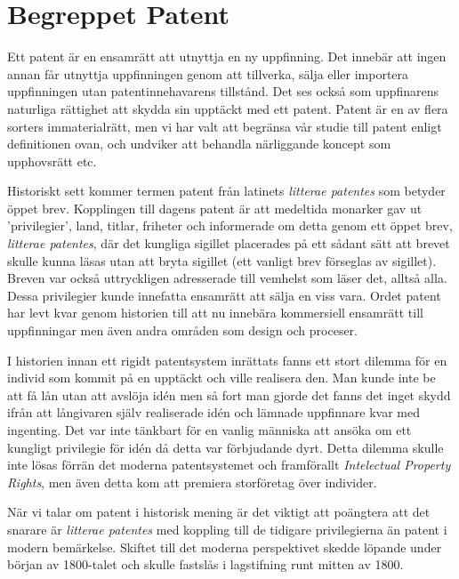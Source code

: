 





\section{Begreppet Patent} %

Ett patent är en ensamrätt att utnyttja en ny uppfinning. Det innebär att ingen
annan får utnyttja uppfinningen genom att tillverka, sälja eller importera 
uppfinningen utan patentinnehavarens tillstånd. Det ses också som uppfinarens naturliga rättighet att skydda sin upptäckt med ett patent. Patent är en av flera sorters
immaterialrätt, men vi har valt att begränsa vår studie till patent enligt
definitionen ovan, och undviker att behandla närliggande koncept som upphovsrätt
etc.


Historiskt sett kommer termen patent från latinets \emph{litterae patentes} som
betyder öppet brev. Kopplingen till dagens patent är att medeltida monarker gav
ut 'privilegier', land, titlar, friheter och informerade om detta genom ett
öppet brev, \emph{litterae patentes}, där det kungliga sigillet placerades på
ett sådant sätt att brevet skulle kunna läsas utan att bryta sigillet\cite{blackstone} (ett vanligt brev förseglas av sigillet). Breven var också uttryckligen adresserade till 
vemhelst som läser det, alltså alla. Dessa privilegier kunde innefatta ensamrätt
att sälja en viss vara. Ordet patent har levt kvar genom historien till 
att nu innebära kommersiell ensamrätt till uppfinningar men även andra områden som design och proceser. 

I historien innan ett rigidt patentsystem inrättats fanns ett stort dilemma för en individ som kommit på en upptäckt och ville realisera den. Man kunde inte be att få lån utan att avslöja idén men så fort man gjorde det fanns det inget skydd ifrån att långivaren själv realiserade idén och lämnade uppfinnare kvar med ingenting. Det var inte tänkbart för en vanlig människa att ansöka om ett kungligt privilegie för idén då detta var förbjudande dyrt. Detta dilemma skulle inte lösas förrän det moderna patentsystemet och framförallt \emph{Intelectual Property Rights}, men även detta kom att premiera storföretag över individer.

När vi talar om patent i historisk mening är det viktigt att poängtera att det 
snarare är \emph{litterae patentes} med koppling till de tidigare 
privilegierna än patent i modern bemärkelse. Skiftet till det moderna perspektivet skedde löpande under början av 1800-talet och skulle fastslås i lagstifning runt mitten av 1800.
